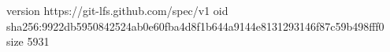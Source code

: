 version https://git-lfs.github.com/spec/v1
oid sha256:9922db5950842524ab0e60fba4d8f1b644a9144e8131293146f87c59b498fff0
size 5931
